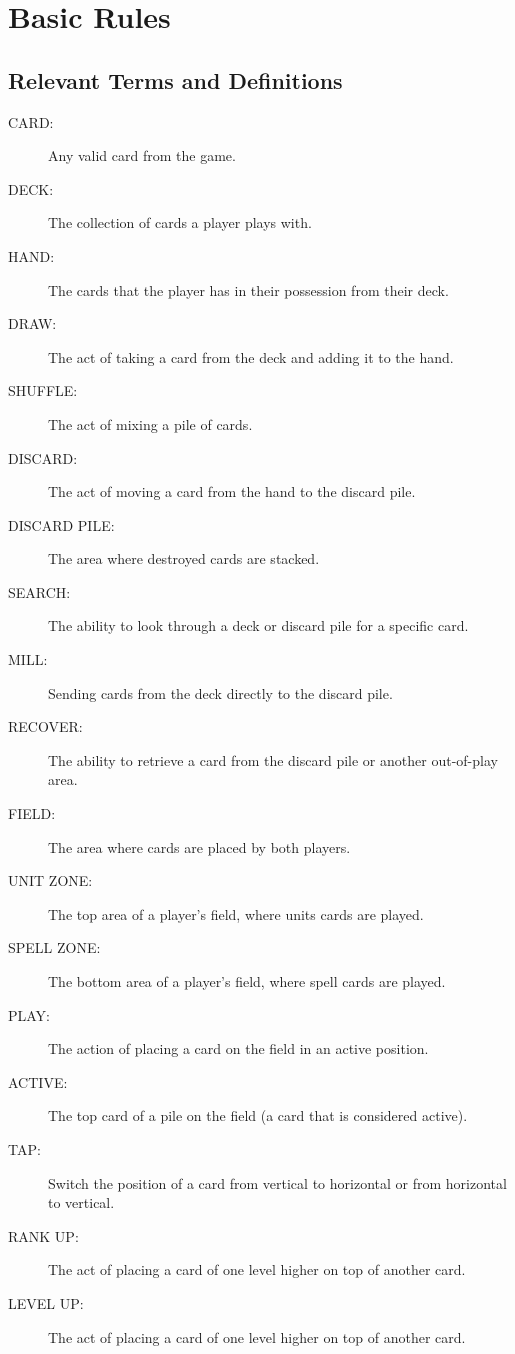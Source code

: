 \chapter{Basic Rules}

\section{Relevant Terms and Definitions}
\begin{description}
    \item[CARD:] Any valid card from the game.
    \item[DECK:] The collection of cards a player plays with.
    \item[HAND:] The cards that the player has in their possession from their deck.
    \item[DRAW:] The act of taking a card from the deck and adding it to the hand.
    \item[SHUFFLE:] The act of mixing a pile of cards.
    \item[DISCARD:] The act of moving a card from the hand to the discard pile.
    \item[DISCARD PILE:] The area where destroyed cards are stacked.
    \item[SEARCH:] The ability to look through a deck or discard pile for a specific card.
    \item[MILL:] Sending cards from the deck directly to the discard pile.
    \item[RECOVER:] The ability to retrieve a card from the discard pile or another out-of-play area.
    \item[FIELD:] The area where cards are placed by both players.
    \item[UNIT ZONE:] The top area of a player's field, where units cards are played.
    \item[SPELL ZONE:] The bottom area of a player's field, where spell cards are played.
    \item[PLAY:] The action of placing a card on the field in an active position.
    \item[ACTIVE:] The top card of a pile on the field (a card that is considered active).
    \item[TAP:] Switch the position of a card from vertical to horizontal or from horizontal to vertical.
    \item[RANK UP:] The act of placing a card of one level higher on top of another card.
	\item[LEVEL UP:] The act of placing a card of one level higher on top of another card.

\end{description}
